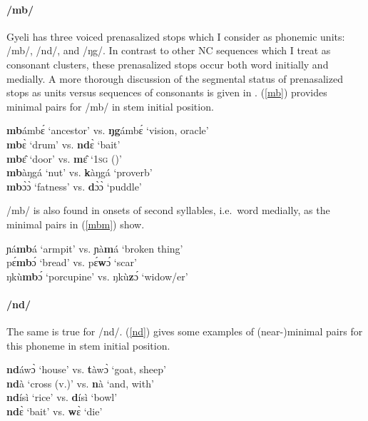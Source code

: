 \paragraph{\bfseries /mb/} Gyeli has three voiced prenasalized stops which I consider as phonemic units: /mb/, /nd/, and /ŋg/. In contrast to other NC sequences which I treat as consonant clusters, these prenasalized stops occur both word initially and medially. A more thorough discussion of the segmental status of prenasalized stops as units versus sequences of consonants is given in . (\ref{mb}) provides minimal pairs for /mb/ in stem initial position.

\begin{exe} \ex \label{mb}
{\bfseries mb}ámbɛ́ `ancestor' vs. {\bfseries ŋg}ámbɛ́ `vision, oracle' \\
{\bfseries mb}ɛ̀ `drum' vs. {\bfseries nd}ɛ̀ `bait' \\
{\bfseries mb}ɛ̂ `door' vs. {\bfseries m}ɛ̂ `1\textsc{sg} ()' \\
{\bfseries mb}àŋgá `nut' vs. {\bfseries k}àŋgá `proverb' \\
{\bfseries mb}ɔ̀ɔ̀ `fatness' vs. {\bfseries d}ɔ̀ɔ̀ `puddle' 
\end{exe}

\noindent /mb/ is also found in onsets of second syllables, i.e.\ word medially, as the minimal pairs in (\ref{mbm}) show.

\begin{exe} \ex \label{mbm}
ɲá{\bfseries mb}á `armpit' vs. ɲà{\bfseries m}á `broken thing' \\
pɛ́{\bfseries mb}ɔ́ `bread' vs. pɛ́{\bfseries w}ɔ́ `scar' \\
ŋkù{\bfseries mb}ɔ́ `porcupine' vs. ŋkù{\bfseries z}ɔ́ `widow/er' 
\end{exe}


\paragraph{\bfseries /nd/} The same is true for /nd/. (\ref{nd}) gives some examples of (near-)minimal pairs for this phoneme in stem initial position.


\begin{exe} \ex \label{nd}
{\bfseries nd}áwɔ̀ `house' vs. {\bfseries t}àwɔ̀ `goat, sheep' \\
{\bfseries nd}à `cross (v.)' vs. {\bfseries n}à `and, with' \\
{\bfseries nd}ísì `rice' vs. {\bfseries d}ísì `bowl' \\
{\bfseries nd}ɛ̀ `bait' vs. {\bfseries w}ɛ̀ `die' 
\end{exe}

